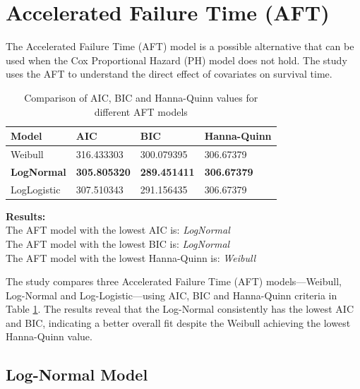 \documentclass[doublespacing,12pt]{report}
\begin{document}
{\section{Accelerated Failure Time (AFT) }

\normalsize{The Accelerated Failure Time (AFT) model is a possible alternative that can be used when the Cox Proportional Hazard (PH) model does not hold. The study uses the AFT to understand the direct effect of covariates on survival time.}


\begin{table}[H]
    \centering
    \normalsize
    \begin{tabularx}{\textwidth}{lXXX}
        \toprule
        Model & AIC & BIC & Hanna-Quinn \\
        \midrule
        Weibull & 316.433303 & 300.079395 & 306.67379 \\
        \textbf{LogNormal} & \textbf{305.805320} & \textbf{289.451411} & \textbf{306.67379} \\
        LogLogistic & 307.510343 & 291.156435 & 306.67379 \\
        \bottomrule
    \end{tabularx}
    \caption{Comparison of AIC, BIC and Hanna-Quinn values for different AFT models}
    \label{tab:model_comparison}
\end{table}



\noindent
\normalsize{\textbf{Results:} \\
The AFT model with the lowest AIC is: \textit{LogNormal} \\
The AFT model with the lowest BIC is: \textit{LogNormal} \\
The AFT model with the lowest Hanna-Quinn is: \textit{Weibull}

\noindent The study compares three Accelerated Failure Time (AFT) models—Weibull, Log-Normal and Log-Logistic—using AIC, BIC and Hanna-Quinn criteria in Table \ref{tab:model_comparison}. The results reveal that the Log-Normal consistently has the lowest AIC and BIC, indicating a better overall fit despite the Weibull achieving the lowest Hanna-Quinn value.}

\subsection{Log-Normal Model}


}
\end{document}
